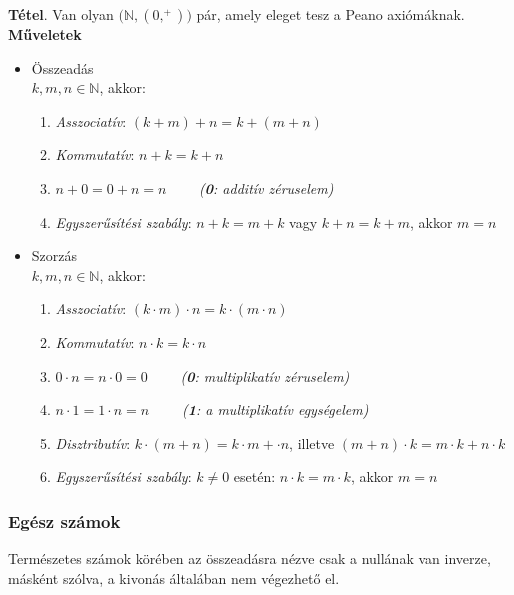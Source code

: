 \documentclass[12pt,margin=0px]{article}
\newcommand{\N}{\mathbb{N}}
\begin{document}
        \noindent \textbf{Tétel}. Van olyan $\big(\mathbb{N}, (0,^{+})\big)$ pár, amely eleget tesz a Peano axiómáknak.\\
\newpage
        \noindent \textbf{Műveletek}
        {\small
        \begin{itemize}[leftmargin=5.5mm]
        \renewcommand{\labelitemi}{$\vcenter{\hbox{\tiny$\bullet$}}$}
            \item Összeadás \\
            $k,m,n \in \N$, akkor:
            \begin{enumerate}
            \item \emph{Asszociatív}: $(k+m)+n = k+(m+n)$
            \item \emph{Kommutatív}: $n+k = k+n$
            \item $n+0 = 0+n = n \qquad$ \textit{(\textbf{0}: additív zéruselem)}
            \item \emph{Egyszerűsítési szabály}: $n+k = m+k$ vagy $k+n = k+m$, akkor $m=n$
            \end{enumerate}
            \item Szorzás \\
            $k,m,n \in \N$, akkor:
            \begin{enumerate}
            \item \emph{Asszociatív}: $(k\cdot m)\cdot n = k\cdot (m\cdot n)$
            \item \emph{Kommutatív}: $n\cdot k = k\cdot n$
            \item $ 0\cdot n = n\cdot 0 = 0 \qquad$ \textit{(\textbf{0}: multiplikatív zéruselem)}
            \item $n\cdot 1 = 1\cdot n = n \qquad$ \textit{(\textbf{1}: a multiplikatív egységelem)}
            \item \emph{Disztributív}: $k\cdot (m+n) = k\cdot m + \cdot n$, illetve $(m+n) \cdot k = m\cdot k+n\cdot k$
            \item \emph{Egyszerűsítési szabály}:  $k\neq 0$ esetén: $n\cdot k = m\cdot k$, akkor $m=n$
            \end{enumerate}
        \end{itemize}
        }

        \subsubsection*{Egész számok\\}
        Természetes számok körében az összeadásra nézve csak a nullának van inverze, másként szólva, a kivonás általában nem végezhető el.\\
\end{document}
